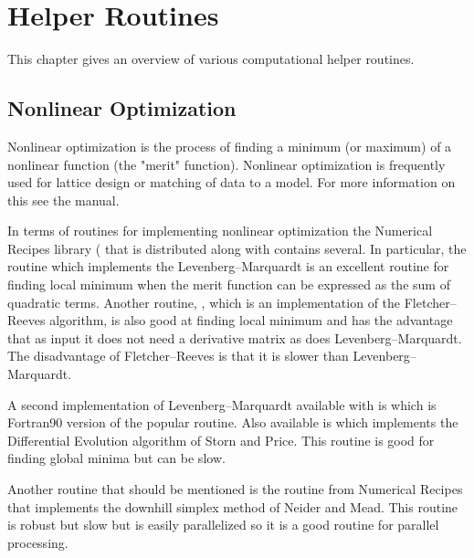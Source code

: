 \chapter{Helper Routines}
\label{c:helper}

This chapter gives an overview of various computational helper routines.

\section{Nonlinear Optimization}
\label{s:opti}

Nonlinear optimization is the process of finding a minimum (or
maximum) of a nonlinear function (the "merit" function). Nonlinear
optimization is frequently used for lattice design or matching of data
to a model. For more information on this see the \tao manual.

In terms of routines for implementing nonlinear optimization the
Numerical Recipes library ( that is distributed along
with \bmad contains several. In particular, 
the routine 
which implements the Levenberg--Marquardt is an excellent routine for
finding local minimum when the merit function can be expressed as the
sum of quadratic terms. Another routine, , which is an
implementation of the Fletcher--Reeves algorithm, is also good at
finding local minimum and has the advantage that as input it does not
need a derivative matrix as does Levenberg--Marquardt. The
disadvantage of Fletcher--Reeves is that it is slower than
Levenberg--Marquardt. 

A second implementation of Levenberg--Marquardt available with \bmad
is  which is Fortran90 version of the popular
 routine. Also available is  which implements
the Differential Evolution algorithm of Storn and
Price\cite{b:de}. This routine is good for finding global minima
but can be slow. 

Another routine that should be mentioned is the  routine
from Numerical Recipes that implements the downhill simplex method of
Neider and Mead. This routine is robust but slow but is easily
parallelized so it is a good routine for parallel processing.

